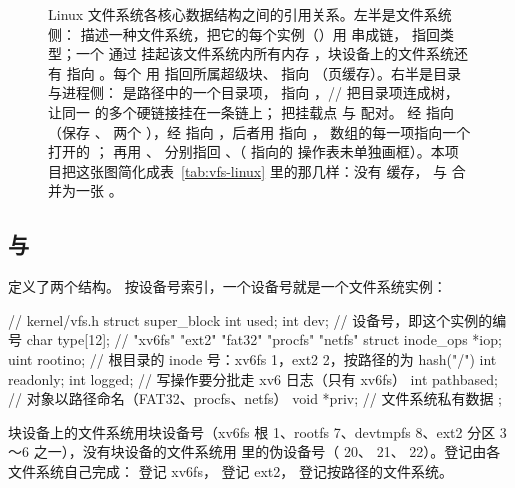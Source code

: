 \begin{figure}
  \centering
  \resizebox{\linewidth}{!}{}
  \caption{Linux 文件系统各核心数据结构之间的引用关系。左半是文件系统侧： 描述一种文件系统，把它的每个实例（）用  串成链， 指回类型；一个  通过  挂起该文件系统内所有内存 ，块设备上的文件系统还有  指向 。每个  用  指回所属超级块、 指向 （页缓存）。右半是目录与进程侧： 是路径中的一个目录项， 指向 ，// 把目录项连成树， 让同一  的多个硬链接挂在一条链上； 把挂载点  与  配对。 经  指向 （保存 、 两个 ），经  指向 ，后者用  指向 ， 数组的每一项指向一个打开的 ； 再用 、 分别指回 、（ 指向的  操作表未单独画框）。本项目把这张图简化成表~\ref{tab:vfs-linux} 里的那几样：没有  缓存， 与  合并为一张 。}
  \label{fig:vfs-structs}
\end{figure}

\subsection{ 与 }

 定义了两个结构。 按设备号索引，一个设备号就是一个文件系统实例：

\begin{ccode}
// kernel/vfs.h
struct super_block {
  int    used;
  int    dev;          // 设备号，即这个实例的编号
  char   type[12];     // "xv6fs" "ext2" "fat32" "procfs" "netfs"
  struct inode_ops *iop;
  uint   rootino;      // 根目录的 inode 号：xv6fs 1，ext2 2，按路径的为 hash("/")
  int    readonly;
  int    logged;       // 写操作要分批走 xv6 日志（只有 xv6fs）
  int    pathbased;    // 对象以路径命名（FAT32、procfs、netfs）
  void   *priv;        // 文件系统私有数据
};
\end{ccode}

块设备上的文件系统用块设备号（xv6fs 根 1、rootfs 7、devtmpfs 8、ext2 分区 3～6 之一），没有块设备的文件系统用  里的伪设备号（ 20、 21、 22）。登记由各文件系统自己完成： 登记 xv6fs， 登记 ext2， 登记按路径的文件系统。

